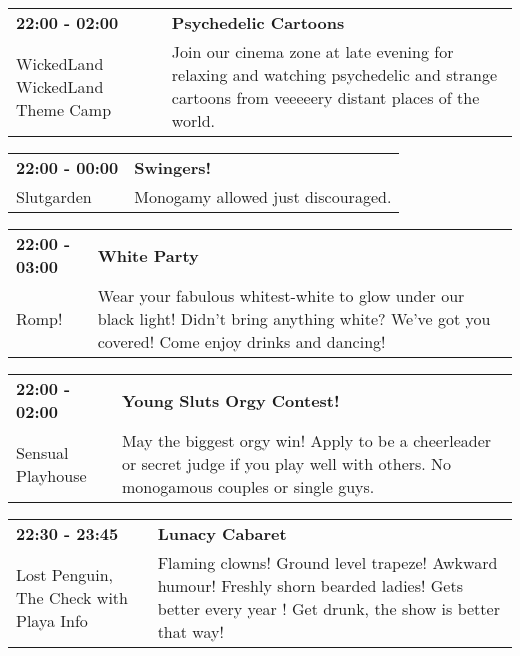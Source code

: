 \begin{tabular}{ p{1in} p{2.2in} }
    \textbf{22:00 - 02:00} & \textbf{Psychedelic Cartoons} \\
    WickedLand \newline WickedLand Theme Camp & Join our cinema zone at late evening for relaxing and watching psychedelic and strange cartoons from veeeeery distant places of the world. \\
    \hline 
\end{tabular}
    
\begin{tabular}{ p{1in} p{2.2in} }
    \textbf{22:00 - 00:00} & \textbf{Swingers!} \\
    Slutgarden \newline  & Monogamy allowed just discouraged. \\
    \hline 
\end{tabular}
    
\begin{tabular}{ p{1in} p{2.2in} }
    \textbf{22:00 - 03:00} & \textbf{White Party} \\
    Romp! \newline  & Wear your fabulous whitest-white to glow under our black light!  Didn't bring anything white? We've got you covered! Come enjoy drinks and dancing! \\
    \hline 
\end{tabular}
    
\begin{tabular}{ p{1in} p{2.2in} }
    \textbf{22:00 - 02:00} & \textbf{Young Sluts Orgy Contest!} \\
    Sensual Playhouse \newline  & May the biggest orgy win! Apply to be a cheerleader or secret judge if you play well with others. No monogamous couples or single guys. \\
    \hline 
\end{tabular}
    
\begin{tabular}{ p{1in} p{2.2in} }
    \textbf{22:30 - 23:45} & \textbf{Lunacy Cabaret} \\
    Lost Penguin, The \newline Check with Playa Info & Flaming clowns! Ground level trapeze!  Awkward humour! Freshly shorn bearded ladies! Gets better every year !  Get drunk, the show is better that way! \\
    \hline 
\end{tabular}
    
